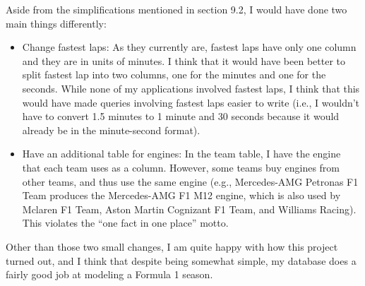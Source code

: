 \documentclass{article} %
\begin{document}
Aside from the simplifications mentioned in section 9.2, I would have
done two main things differently:
\begin{itemize}
    \item Change fastest laps: As they currently are, fastest laps have
    only one column and they are in units of minutes. I think that it
    would have been better to split fastest lap into two columns, one
    for the minutes and one for the seconds. While none of my
    applications involved fastest laps, I think that this would have
    made queries involving fastest laps easier to write (i.e., I
    wouldn't have to convert 1.5 minutes to 1 minute and 30 seconds
    because it would already be in the minute-second format).

    \item Have an additional table for engines: In the team table, I
    have the engine that each team uses as a column. However, some teams
    buy engines from other teams, and thus use the same engine (e.g.,
    Mercedes-AMG Petronas F1 Team produces the Mercedes-AMG F1 M12
    engine, which is also used by Mclaren F1 Team, Aston Martin
    Cognizant F1 Team, and Williams Racing). This violates the ``one
    fact in one place'' motto.
\end{itemize}
Other than those two small changes, I am quite happy with how this
project turned out, and I think that despite being somewhat simple, my
database does a fairly good job at modeling a Formula 1 season.
\end{document}
